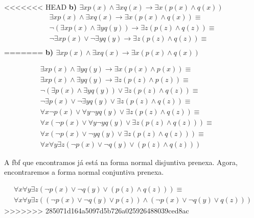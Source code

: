 <<<<<<< HEAD
\textbf{b) $\exists x p(x) \land \exists x q(x) \rightarrow \exists x (p(x) \land q(x)) $}\\

\begin{align*}
\exists x p(x) \land \exists x q(x) \rightarrow \exists x (p(x) \land q(x)) \equiv \\
\lnot (\exists x p(x) \land \exists y q(y)) \rightarrow \exists z (p(z) \land q(z)) \equiv \\
\lnot \exists x p(x) \lor \lnot \exists y q(y) \rightarrow \exists z (p(z) \land q(z)) \equiv \\
\end{align*}
=======
\textbf{b) $\exists x p(x) \land \exists x q(x) \rightarrow \exists x (p(x) \land q(x)) $}

\begin{align*}
	\exists x p(x) \land \exists y q(y) \rightarrow \exists x (p(x) \land p(x)) \equiv                                 \\
	\exists x p(x) \land \exists y q(y) \rightarrow \exists z (p(z) \land p(z)) \equiv  &  & \tag*{Renom.}             \\
	\lnot (\exists p (x) \land \exists y q(y)) \lor \exists z (p(z) \land q(z))  \equiv &  & \tag*{Rem. $\rightarrow$} \\
	\lnot \exists p (x) \lor \lnot \exists y q(y) \lor \exists z (p(z) \land q(z)) \equiv                              \\
	\forall x \lnot p (x) \lor \forall y \lnot y q(y) \lor \exists z (p(z) \land q(z)) \equiv                          \\
	\forall x (\lnot p (x) \lor \forall y \lnot y q(y) \lor \exists z (p(z) \land q(z))) \equiv                        \\
	\forall x (\lnot p (x) \lor \lnot y q(y) \lor \exists z (p(z) \land q(z)))  \equiv                                 \\
	\forall x \forall y \exists z (\lnot p (x) \lor \lnot q(y) \lor (p(z) \land q(z)))
\end{align*}

A fbf que encontramos já está na forma normal disjuntiva prenexa.
Agora, encontraremos a forma normal conjuntiva prenexa.

\begin{align*}
	\forall x \forall y \exists z (\lnot p (x) \lor \lnot q(y) \lor (p(z) \land q(z))) \equiv \\
	\forall x \forall y \exists z ((\lnot p(x) \lor \lnot q(y) \lor p(z)) \land (\lnot p(x) \lor \lnot q(y) \lor q(z)))
\end{align*}
>>>>>>> 285071d164a5097d5b726a025926488039ced8ac
